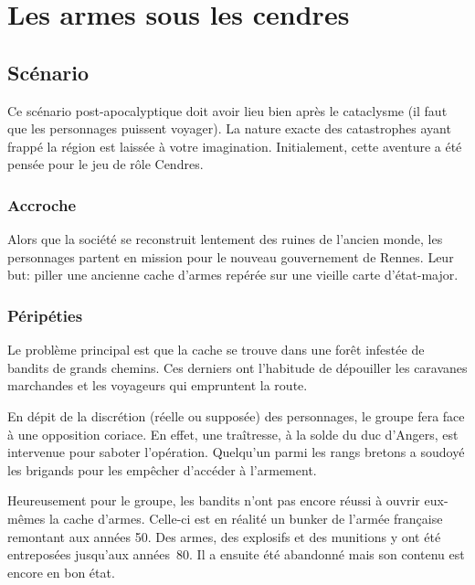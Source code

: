 \chapter{Les armes sous les cendres}

\section{Scénario}

Ce scénario post-apocalyptique doit avoir lieu bien après le cataclysme (il faut que les personnages puissent voyager).
La nature exacte des catastrophes ayant frappé la région est laissée à votre imagination.
Initialement, cette aventure a été pensée pour le jeu de rôle Cendres.

\subsection{Accroche}

Alors que la société se reconstruit lentement des ruines de l'ancien monde, les personnages partent en mission pour le nouveau gouvernement de Rennes.
Leur but: piller une ancienne cache d'armes repérée sur une vieille carte d'état-major.

\subsection{Péripéties}

Le problème principal est que la cache se trouve dans une forêt infestée de bandits de grands chemins.
Ces derniers ont l'habitude de dépouiller les caravanes marchandes et les voyageurs qui empruntent la route.

En dépit de la discrétion (réelle ou supposée) des personnages, le groupe fera face à une opposition coriace.
En effet, une traîtresse, à la solde du duc d'Angers, est intervenue pour saboter l'opération.
Quelqu'un parmi les rangs bretons a soudoyé les brigands pour les empêcher d'accéder à l'armement.

Heureusement pour le groupe, les bandits n'ont pas encore réussi à ouvrir eux-mêmes la cache d'armes.
Celle-ci est en réalité un bunker de l'armée française remontant aux années 50.
Des armes, des explosifs et des munitions y ont été entreposées jusqu'aux années 80.
Il a ensuite été abandonné mais son contenu est encore en bon état.

